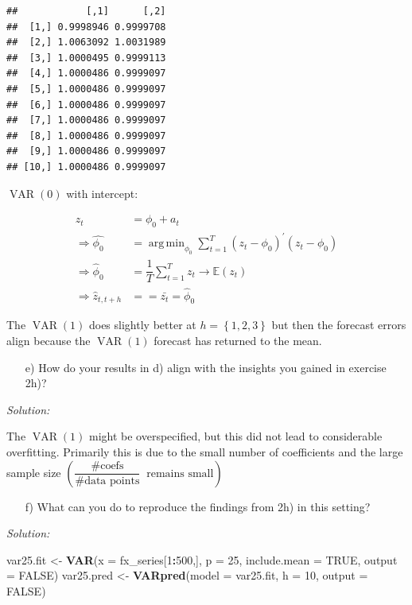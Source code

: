 \documentclass[12pt,a4paper]{article}
\DeclareMathOperator*{\argmin}{arg\,min}
\newcommand{\VAR}{\operatorname{VAR}} %
\newenvironment{Shaded}{\begin{snugshade}}{\end{snugshade}}
\newcommand{\DataTypeTok}[1]{\textcolor[rgb]{0.13,0.29,0.53}{#1}}
\newcommand{\DecValTok}[1]{\textcolor[rgb]{0.00,0.00,0.81}{#1}}
\newcommand{\KeywordTok}[1]{\textcolor[rgb]{0.13,0.29,0.53}{\textbf{#1}}}
\newcommand{\NormalTok}[1]{#1}
\newcommand{\OperatorTok}[1]{\textcolor[rgb]{0.81,0.36,0.00}{\textbf{#1}}}
\newcommand{\OtherTok}[1]{\textcolor[rgb]{0.56,0.35,0.01}{#1}}
\newcommand{\StringTok}[1]{\textcolor[rgb]{0.31,0.60,0.02}{#1}}
\begin{document}
\begin{verbatim}
##            [,1]      [,2]
##  [1,] 0.9998946 0.9999708
##  [2,] 1.0063092 1.0031989
##  [3,] 1.0000495 0.9999113
##  [4,] 1.0000486 0.9999097
##  [5,] 1.0000486 0.9999097
##  [6,] 1.0000486 0.9999097
##  [7,] 1.0000486 0.9999097
##  [8,] 1.0000486 0.9999097
##  [9,] 1.0000486 0.9999097
## [10,] 1.0000486 0.9999097
\end{verbatim}

\(\VAR(0)\) with intercept:

\begin{align*}
  z_t & = \phi_0 + a_t\\
  \Rightarrow \hat{\phi_0} & = \argmin_{\phi_0} \sum_{t = 1}^{T} \left(z_t - \phi_0 \right)^{'} \left(z_t - \phi_0 \right)\\
  \Rightarrow \hat{\phi}_0 & = \dfrac{1}{T} \sum_{t = 1}^{T} z_t \rightarrow \mathbb{E} (z_t)\\
  \Rightarrow \hat{z}_{t,t+h} &= = \bar{z_t} = \hat{\phi}_0
\end{align*}

The \(\VAR(1)\) does slightly better at \(h = \left\{ 1,2,3 \right\}\)
but then the forecast errors align because the \(\VAR(1)\) forecast has
returned to the mean.

\begin{itemize}
  \item[e)] How do your results in d) align with the insights you gained in exercise 2h)?
\end{itemize}

\emph{Solution:}

The \(\VAR(1)\) might be overspecified, but this did not lead to
considerable overfitting. Primarily this is due to the small number of
coefficients and the large sample size
\(\left( \dfrac{\# \text{coefs}}{\# \text{data points}} \; \; \text{remains small}\right)\)

\begin{itemize}
  \item[f)]  What can you do to reproduce the findings from 2h) in this setting?
\end{itemize}

\emph{Solution:}

\begin{Shaded}
\begin{Highlighting}[]
\NormalTok{var25.fit <-}\StringTok{ }\KeywordTok{VAR}\NormalTok{(}\DataTypeTok{x =}\NormalTok{ fx_series[}\DecValTok{1}\OperatorTok{:}\DecValTok{500}\NormalTok{,], }\DataTypeTok{p =} \DecValTok{25}\NormalTok{, }\DataTypeTok{include.mean =} \OtherTok{TRUE}\NormalTok{, }\DataTypeTok{output =} \OtherTok{FALSE}\NormalTok{)}
\NormalTok{var25.pred <-}\StringTok{ }\KeywordTok{VARpred}\NormalTok{(}\DataTypeTok{model =}\NormalTok{ var25.fit, }\DataTypeTok{h =} \DecValTok{10}\NormalTok{, }\DataTypeTok{output =} \OtherTok{FALSE}\NormalTok{)}
\end{Highlighting}
\end{Shaded}
\end{document}
